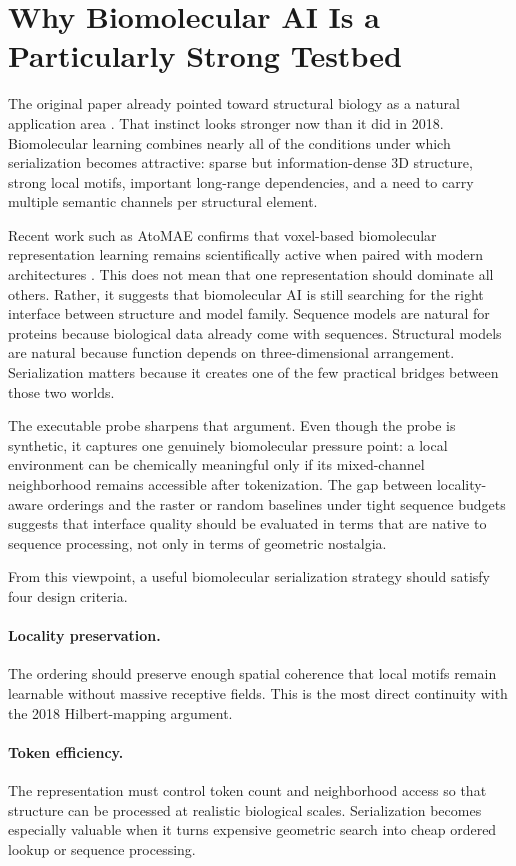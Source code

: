 \section{Why Biomolecular AI Is a Particularly Strong Testbed}

The original paper already pointed toward structural biology as a natural application area \citep{corcoran2018spatial}. That instinct looks stronger now than it did in 2018. Biomolecular learning combines nearly all of the conditions under which serialization becomes attractive: sparse but information-dense 3D structure, strong local motifs, important long-range dependencies, and a need to carry multiple semantic channels per structural element.

Recent work such as AtoMAE confirms that voxel-based biomolecular representation learning remains scientifically active when paired with modern architectures \citep{park2025atomae}. This does not mean that one representation should dominate all others. Rather, it suggests that biomolecular AI is still searching for the right interface between structure and model family. Sequence models are natural for proteins because biological data already come with sequences. Structural models are natural because function depends on three-dimensional arrangement. Serialization matters because it creates one of the few practical bridges between those two worlds.

The executable probe sharpens that argument. Even though the probe is synthetic, it captures one genuinely biomolecular pressure point: a local environment can be chemically meaningful only if its mixed-channel neighborhood remains accessible after tokenization. The gap between locality-aware orderings and the raster or random baselines under tight sequence budgets suggests that interface quality should be evaluated in terms that are native to sequence processing, not only in terms of geometric nostalgia.

From this viewpoint, a useful biomolecular serialization strategy should satisfy four design criteria.

\paragraph{Locality preservation.}
The ordering should preserve enough spatial coherence that local motifs remain learnable without massive receptive fields. This is the most direct continuity with the 2018 Hilbert-mapping argument.

\paragraph{Token efficiency.}
The representation must control token count and neighborhood access so that structure can be processed at realistic biological scales. Serialization becomes especially valuable when it turns expensive geometric search into cheap ordered lookup or sequence processing.

